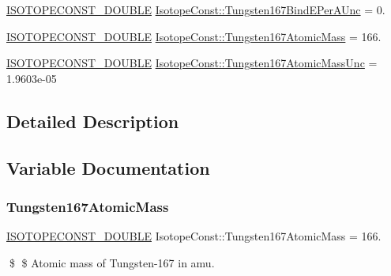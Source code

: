 \begin{DoxyCompactItemize}
\mbox{\hyperlink{group___isotope_const-_macros_ga8f45a7272ce02c0b4c65c44636ed719a}{I\+S\+O\+T\+O\+P\+E\+C\+O\+N\+S\+T\+\_\+\+D\+O\+U\+B\+LE}} \mbox{\hyperlink{group___isotope_const-_tungsten-_w167_gae97fc4dd8eb401e602621693d0c7dc2e}{Isotope\+Const\+::\+Tungsten167\+Bind\+E\+Per\+A\+Unc}} = 0.
\item 
\mbox{\hyperlink{group___isotope_const-_macros_ga8f45a7272ce02c0b4c65c44636ed719a}{I\+S\+O\+T\+O\+P\+E\+C\+O\+N\+S\+T\+\_\+\+D\+O\+U\+B\+LE}} \mbox{\hyperlink{group___isotope_const-_tungsten-_w167_gaad7a921a542162531f07d4894c59587f}{Isotope\+Const\+::\+Tungsten167\+Atomic\+Mass}} = 166.
\item 
\mbox{\hyperlink{group___isotope_const-_macros_ga8f45a7272ce02c0b4c65c44636ed719a}{I\+S\+O\+T\+O\+P\+E\+C\+O\+N\+S\+T\+\_\+\+D\+O\+U\+B\+LE}} \mbox{\hyperlink{group___isotope_const-_tungsten-_w167_ga7aeda40ebe56ad681e372b57033c5d7b}{Isotope\+Const\+::\+Tungsten167\+Atomic\+Mass\+Unc}} = 1.\+9603e-\/05
\end{DoxyCompactItemize}


\subsection{Detailed Description}


\subsection{Variable Documentation}
\mbox{\label{group___isotope_const-_tungsten-_w167_gaad7a921a542162531f07d4894c59587f}} 
\subsubsection{\texorpdfstring{Tungsten167\+Atomic\+Mass}{Tungsten167AtomicMass}}
{\footnotesize\ttfamily \mbox{\hyperlink{group___isotope_const-_macros_ga8f45a7272ce02c0b4c65c44636ed719a}{I\+S\+O\+T\+O\+P\+E\+C\+O\+N\+S\+T\+\_\+\+D\+O\+U\+B\+LE}} Isotope\+Const\+::\+Tungsten167\+Atomic\+Mass = 166.}

\$ \$ Atomic mass of Tungsten-\/167 in amu. \mbox{\label{group___isotope_const-_tungsten-_w167_ga7aeda40ebe56ad681e372b57033c5d7b}} 
